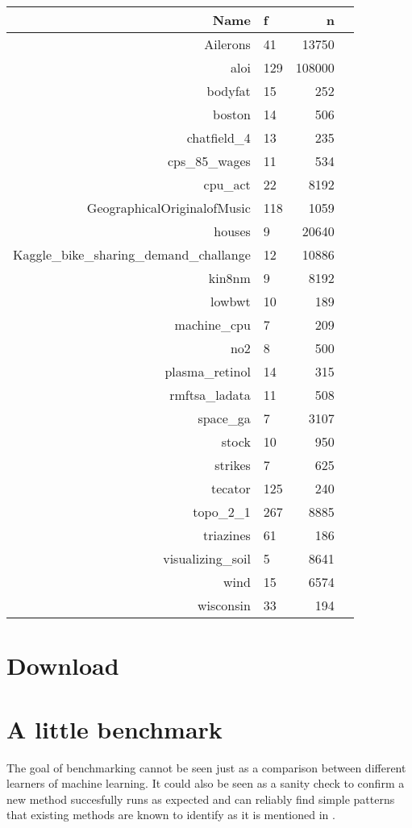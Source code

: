\documentclass[a4paper]{article}
\begin{document}
\begin{table}[ht]
	\centering
	\begin{tabular}{rlrr}
		\hline
		 Name & f & n \\ 
		\hline
		 Ailerons &  41 & 13750 \\ 
		 aloi & 129 & 108000 \\ 
		 bodyfat &  15 & 252 \\ 
		 boston &  14 & 506 \\ 
		 chatfield\_4 &  13 & 235 \\ 
		 cps\_85\_wages &  11 & 534 \\ 
		 cpu\_act &  22 & 8192 \\ 
		 GeographicalOriginalofMusic & 118 & 1059 \\ 
		 houses &   9 & 20640 \\ 
		 Kaggle\_bike\_sharing\_demand\_challange &  12 & 10886 \\ 
		 kin8nm &   9 & 8192 \\ 
		 lowbwt &  10 & 189 \\ 
		 machine\_cpu &   7 & 209 \\ 
		 no2 &   8 & 500 \\ 
		 plasma\_retinol &  14 & 315 \\ 
		 rmftsa\_ladata &  11 & 508 \\ 
		 space\_ga &   7 & 3107 \\ 
		 stock &  10 & 950 \\ 
		 strikes &   7 & 625 \\ 
		 tecator & 125 & 240 \\ 
		 topo\_2\_1 & 267 & 8885 \\ 
		 triazines &  61 & 186 \\ 
		 visualizing\_soil &   5 & 8641 \\ 
		 wind &  15 & 6574 \\ 
		 wisconsin &  33 & 194 \\ 
		\hline
	\end{tabular}
\end{table}

\section{Download}

\section{A little benchmark}

The goal of benchmarking cannot be seen just as a comparison between different learners of machine learning.
It could also be seen as a sanity check to confirm a new method succesfully runs as expected and can reliably find simple patterns that existing methods are known to identify as it is mentioned in \citet{Hastie2009}. 
\end{document}

